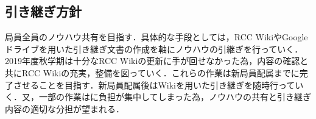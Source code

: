 \subsection*{引き継ぎ方針}

局員全員のノウハウ共有を目指す．具体的な手段としては，RCC WikiやGoogleドライブを用いた引き継ぎ文書の作成を軸にノウハウの引継ぎを行っていく．2019年度秋学期は十分なRCC Wikiの更新に手が回せなかった為，内容の確認と共にRCC Wikiの充実，整備を図っていく．これらの作業は新局員配属までに完了させることを目指す．新局員配属後はWikiを用いた引き継ぎを随時行っていく．又，一部の作業は\thirdGrade{}に負担が集中してしまった為，ノウハウの共有と引き継ぎ内容の適切な分担が望まれる．